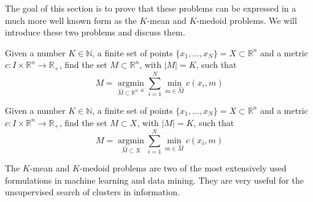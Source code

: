 The goal of this section is to prove that these problems can be expressed in a much more well known form as the $K$-mean and $K$-medoid problems. We will introduce these two problems and discuss them.
\begin{problem}[$K$-Means]
  \label{prb:kmeans-problem-definition}
  Given a number $K\in \mathbb{N}$, a finite set of points $\{x_1,\ldots , x_N\} = X\subset\mathbb{R}^n$ and a metric $c:I\times \mathbb{R}^n\rightarrow\mathbb{R}_+$, find the set $M\subset\mathbb{R}^{n}$, with $|M|=K$, such that
  \begin{equation}
    \label{eq:kmeans-problem-definition}
    M = \underset{\hat{M}\subset\mathbb{R}^{n\cdot K}}{\operatorname{argmin}} \sum_{i=1}^N\min\limits_{m\in \hat{M}}c(x_i, m)
  \end{equation}
\end{problem}
\begin{problem}[$K$-Medoids]
  \label{prb:kmedoids-problem-definition}
  Given a number $K\in \mathbb{N}$, a finite set of points $\{x_1,\ldots , x_N\} = X\subset\mathbb{R}^n$ and a metric $c:I\times \mathbb{R}^n\rightarrow\mathbb{R}_+$, find the set $M\subset X$, with $|M|=K$, such that
  \begin{equation}
    \label{eq:kmedoids-problem-definition}
    M = \underset{\hat{M}\subset X}{\operatorname{argmin}} \sum_{i=1}^N\min\limits_{m\in \hat{M}}c(x_i, m)
  \end{equation} 
\end{problem}
The $K$-mean and $K$-medoid problems are two of the most extensively used formulations in machine learning and data mining. 
They are very useful for the unsupervised search of clusters in information. 

